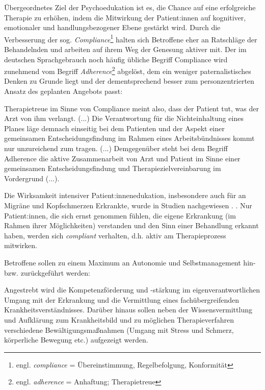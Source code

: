 \documentclass[
  twoside,
  parskip=half-,
]{scrreprt}
\begin{document}
Übergeordnetes Ziel der Psychoedukation ist es, die Chance auf eine erfolgreiche Therapie zu erhöhen, indem die Mitwirkung der Patient:innen auf kognitiver, emotionaler und handlungsbezogener Ebene gestärkt wird. Durch die Verbesserung der sog. \textit{Compliance}\footnote{engl. \textit{compliance} = Übereinstimmung, Regelbefolgung, Konformität} halten sich Betroffene eher an Ratschläge der Behandelnden und arbeiten auf ihrem Weg der Genesung aktiver mit. Der im deutschen Sprachgebrauch noch häufig übliche Begriff Compliance wird zunehmend vom Begriff \textit{Adherence}\footnote{engl. \textit{adherence} = Anhaftung; Therapietreue} abgelöst, dem ein weniger paternalistisches Denken zu Grunde liegt und der dementsprechend besser zum personzentrierten Ansatz des geplanten Angebots passt: 

\begin{displayquote}
  Therapietreue im Sinne von Compliance meint also, dass der Patient tut, was der Arzt von ihm verlangt. (...) Die Verantwortung für die Nichteinhaltung eines Planes läge demnach einseitig bei dem Patienten und der Aspekt einer gemeinsamen Entscheidungsfindung im Rahmen eines Arbeitsbündnisses kommt nur unzureichend zum tragen. (...) Demgegenüber steht bei dem Begriff Adherence die aktive Zusammenarbeit von Arzt und Patient im Sinne einer gemeinsamen Entscheidungsfindung und Therapiezielvereinbarung im Vordergrund (...).
\end{displayquote}

Die Wirksamkeit intensiver Patient:innenedukation, insbesondere auch für an Migräne und Kopfschmerzen Erkrankte, wurde in Studien nachgewiesen \autocite[vgl.][]{rothrock}.
. Nur Patient:innen, die sich ernst genommen fühlen, die eigene Erkrankung (im Rahmen ihrer Möglichkeiten) verstanden und den Sinn einer Behandlung erkannt haben, werden sich \textit{compliant} verhalten, d.h. aktiv am Therapieprozess mitwirken.  

Betroffene sollen zu einem Maximum an Autonomie und Selbstmanagement hin- bzw. zurückgeführt werden: 
\begin{displayquote}
  Angestrebt wird die Kompetenzförderung und -stärkung im eigenverantwortlichen Umgang mit der Erkrankung und die Vermittlung eines fachübergreifenden Krankheitsverständnisses. Darüber hinaus sollen neben der Wissensvermittlung und Aufklärung zum Krankheitsbild und zu möglichen Therapieverfahren verschiedene Bewältigungsmaßnahmen (Umgang mit Stress und Schmerz, körperliche Bewegung etc.) aufgezeigt werden.
\end{displayquote}
\end{document}
